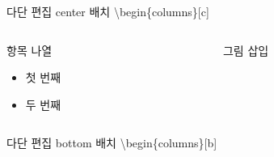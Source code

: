 \documentclass[9pt,blue,xcolor=pdftex,dvipsnames,table,handout,notes]{beamer}
\begin{document}
\begin{frame}[t]
\begin{columns}[T]
\begin{column}{.4\textwidth}
		\end{column}
		\end{columns}


			\begin{example} {다단 편집 center 배치}
			\textbackslash begin\{columns\}[c]
			\end{example} 


		\begin{columns}[T,totalwidth=1.0\textwidth]
		\begin{column}{.5\textwidth}
			\begin{block} {항목 나열}
			\begin{itemize}
			\item 첫 번째
			\item 두 번째
			\end{itemize}
			\end{block}

		\end{column}

		\begin{column}{.45\textwidth}
			\begin{block} {그림 삽입}
			\end{block}

		\end{column}
		\end{columns}






			\begin{example} {다단 편집 bottom 배치}
			\textbackslash begin\{columns\}[b]
			\end{example}


\end{frame}
\end{document}
